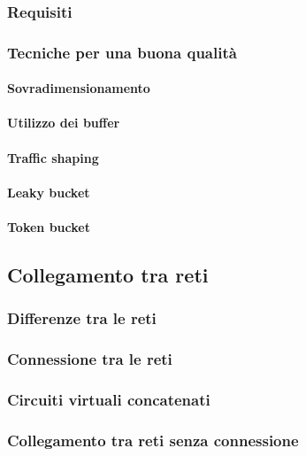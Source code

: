 \subsubsection{Requisiti}

\subsubsection{Tecniche per una buona qualità}

\paragraph{Sovradimensionamento}

\paragraph{Utilizzo dei buffer}

\paragraph{Traffic shaping}

\paragraph{Leaky bucket}

\paragraph{Token bucket}

\subsection{Collegamento tra reti}

\subsubsection{Differenze tra le reti}

\subsubsection{Connessione tra le reti}

\subsubsection{Circuiti virtuali concatenati}

\subsubsection{Collegamento tra reti senza connessione}


